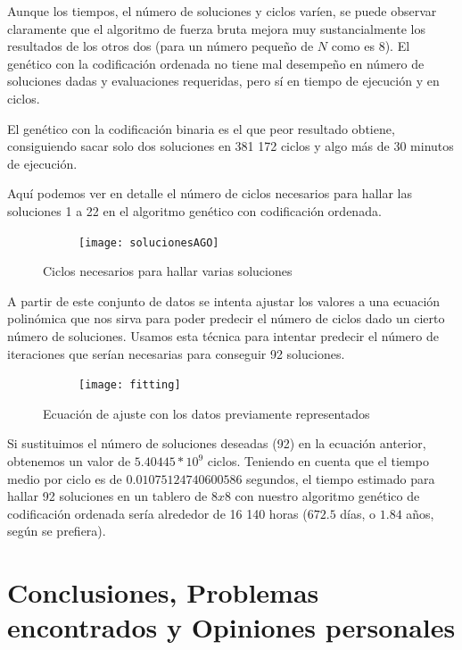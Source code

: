 \documentclass[12pt]{article}
\begin{document}
Aunque los tiempos, el número de soluciones y ciclos varíen, se puede observar claramente que el algoritmo de fuerza bruta mejora muy sustancialmente los resultados de los otros dos (para un número pequeño de $N$ como es 8). El genético con la codificación ordenada no tiene mal desempeño en número de soluciones dadas y evaluaciones requeridas, pero sí en tiempo de ejecución y en ciclos.

El genético con la codificación binaria es el que peor resultado obtiene, consiguiendo sacar solo dos soluciones en 381 172 ciclos y algo más de 30 minutos de ejecución.

Aquí podemos ver en detalle el número de ciclos necesarios para hallar las soluciones 1 a 22 en el algoritmo genético con codificación ordenada.

\clearpage\newpage
\begin{figure}[h]
    \center
    \begin{subfigure}{.50\textwidth}
        \texttt{[image: solucionesAGO]}
    \end{subfigure}
    \caption{Ciclos necesarios para hallar varias soluciones}
\end{figure}

A partir de este conjunto de datos se intenta ajustar los valores a una ecuación polinómica que nos sirva para poder predecir el número de ciclos dado un cierto número de soluciones. Usamos esta técnica para intentar predecir el número de iteraciones que serían necesarias para conseguir 92 soluciones.

\begin{figure}[h]
    \center
    \begin{subfigure}{.90\textwidth}
        \texttt{[image: fitting]}
    \end{subfigure}
    \caption{Ecuación de ajuste con los datos previamente representados}
\end{figure}

Si sustituimos el número de soluciones deseadas (92) en la ecuación anterior, obtenemos un valor de $5.40445*10^9$ ciclos. Teniendo en cuenta que el tiempo medio por ciclo es de $0.01075124740600586$ segundos, el tiempo estimado para hallar 92 soluciones en un tablero de $8x8$ con nuestro algoritmo genético de codificación ordenada sería alrededor de 16 140 horas ($672.5$ días, o $1.84$ años, según se prefiera).

\clearpage\newpage

\section{Conclusiones, Problemas encontrados y Opiniones personales}
\end{document}
